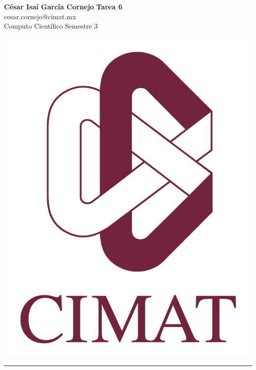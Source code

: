 \documentclass[a4paper, 11pt]{article}
\begin{document}
	\noindent
	
	\begin{minipage}[b][1.2cm][t]{0.8\textwidth}
		\large\textbf{César Isaí García Cornejo} \hfill \textbf{Tarea 6}  \\
		cesar.cornejo@cimat.mx \hfill \\
		\normalsize Computo Científico \hfill Semestre 3\\
	\end{minipage}
	
	\hspace{14.4cm}
	\begin{minipage}[b][0.03cm][t]{0.12\linewidth}
		
		\vspace{-2.2cm}
		\includegraphics[scale=0.3]{Figures/EscudoCimat.png}
	\end{minipage}
	
	\noindent\rule{7in}{2.8pt}
	
\end{document}
